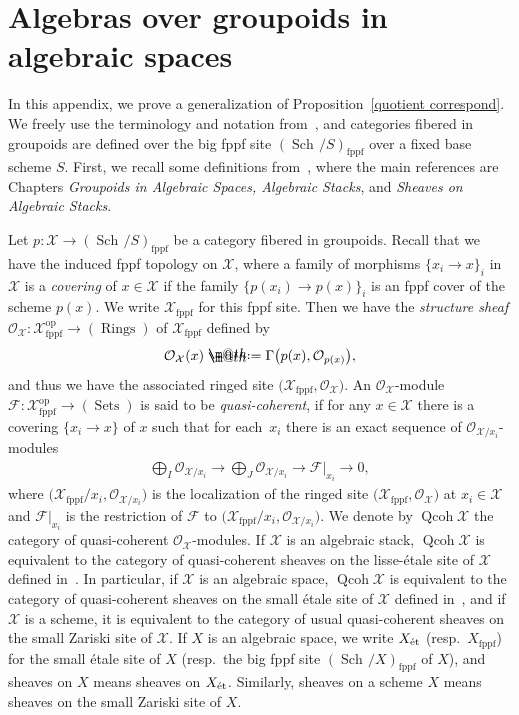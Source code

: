 \documentclass[11pt]{article}
\makeatletter
\numberwithin{equation}{section}
\newcommand*{\defeq}{\mathrel{\rlap{%
 \raisebox{0.3ex}{$\m@th\cdot$}}%
 \raisebox{-0.3ex}{$\m@th\cdot$}}%
 =}
\numberwithin{equation}{section}
\newcommand{\Qcoh}{\operatorname{Qcoh}}
\newcommand{\Sch}{\operatorname{Sch\!}}
\newcommand{\fppf}{\operatorname{fppf}}
\newcommand{\Rings}{\operatorname{Rings}}
\newcommand{\Sets}{\operatorname{Sets}}
\newcommand{\op}{\operatorname{op}}
\newcommand{\et}{\text{\rm \'et}}
\newcommand{\cF}{\mathcal{F}}
\newcommand{\cO}{\mathcal{O}}
\newcommand{\cX}{\mathcal{X}}
\makeatother
\begin{document}
\appendix

\section{Algebras over groupoids in algebraic spaces}\label{appendix}

In this appendix, we prove a generalization of Proposition~\ref{quotient correspond}. We freely use the terminology and notation from~\cite{stacks}, and categories fibered in groupoids are defined over the big fppf site $(\Sch/S)_{\fppf}$ over a fixed base scheme $S$. First, we recall some definitions from~\cite{stacks}, where the main references are Chapters {\it Groupoids in Algebraic Spaces, Algebraic Stacks}, and {\it Sheaves on Algebraic Stacks}.

Let $p\colon \cX\to (\Sch/S)_{\fppf}$ be a category fibered in groupoids. Recall that we have the induced fppf topology on $\cX$, where a family of morphisms $\{x_i\to x\}_{i}$ in $\cX$ is a {\it covering} of $x\in \cX$ if the family $\{ p(x_i)\to p(x)\}_i$ is an fppf cover of the scheme $p(x)$. We write $\cX_{\fppf}$ for this fppf site. Then we have the {\it structure sheaf} $\cO_{\cX}\colon \cX_{\fppf}^{\op}\to (\Rings)$ of $\cX_{\fppf}$ defined by
\begin{gather*}
\cO_{\cX}(x)\defeq\Gamma\big(p(x),\cO_{p(x)}\big),
\end{gather*}
and thus we have the associated ringed site $\big(\cX_{\fppf},\cO_{\cX}\big)$. An $\cO_{\cX}$-module $\cF\colon\cX_{\fppf}^{\op}\to (\Sets)$ is said to be {\it quasi-coherent}, if for any $x\in \cX$ there is a covering $\{x_i\to x\}$ of $x$ such that for each~$x_i$ there is an exact sequence of $\cO_{\cX/x_i}$-modules
\begin{gather*}
\bigoplus_{I}\cO_{\cX/x_i}\to \bigoplus_{J}\cO_{\cX/x_i}\to\cF|_{x_i}\to 0,
\end{gather*}
 where $\big(\cX_{\fppf}/x_i,\cO_{\cX/x_i}\big)$ is the localization of the ringed site $\big(\cX_{\fppf},\cO_{\cX}\big)$ at $x_i\in\cX$ and $\cF|_{x_i}$ is the restriction of $\cF$ to $\big(\cX_{\fppf}/x_i,\cO_{\cX/x_i}\big)$. We denote by $\Qcoh \cX$ the category of quasi-coherent $\cO_{\cX}$-modules. If $\cX$ is an algebraic stack, $\Qcoh \cX$ is equivalent to the category of quasi-coherent sheaves on the lisse-\'etale site of $\cX$ defined in~\cite[Definition 9.1.14]{olsson}. In particular, if $\cX$ is an algebraic space, $\Qcoh \cX$ is equivalent to the category of quasi-coherent sheaves on the small \'etale site of $\cX$ defined in~\cite[Definition 7.1.5]{olsson}, and if $\cX$ is a scheme, it is equivalent to the category of usual quasi-coherent sheaves on the small Zariski site of $\cX$. If $X$ is an algebraic space, we write $X_{\et}$ (resp.\ $X_{\fppf}$) for the small \'etale site of $X$ (resp.\ the big fppf site $(\Sch/X)_{\fppf}$ of $X$), and sheaves on $X$ means sheaves on $X_{\et}$. Similarly, sheaves on a scheme $X$ means sheaves on the small Zariski site of $X$.
\end{document}
